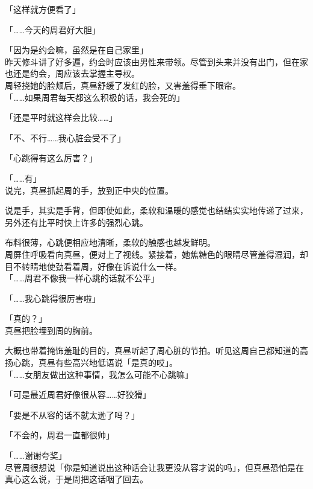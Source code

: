 「这样就方便看了」

「……今天的周君好大胆」

「因为是约会嘛，虽然是在自己家里」\\

昨天修斗讲了好多遍，约会时应该由男性来带领。尽管到头来并没有出门，但在家也还是约会，周应该去掌握主导权。\\

周轻挠她的脸颊后，真昼舒缓了发红的脸，又害羞得垂下眼帘。\\

「……如果周君每天都这么积极的话，我会死的」

「还是平时就这样会比较……」

「不、不行……我心脏会受不了」

「心跳得有这么厉害？」

「……有」\\

说完，真昼抓起周的手，放到正中央的位置。

说是手，其实是手背，但即使如此，柔软和温暖的感觉也结结实实地传递了过来，另外还有比平时快上许多的强烈心跳。

布料很薄，心跳便相应地清晰，柔软的触感也越发鲜明。\\

周屏住呼吸看向真昼，便对上了视线。紧接着，她焦糖色的眼睛尽管羞得湿润，却目不转睛地使劲看着周，好像在诉说什么一样。\\

「……周君不像我一样心跳的话就不公平」

「……我心跳得很厉害啦」

「真的？」\\

真昼把脸埋到周的胸前。

大概也带着掩饰羞耻的目的，真昼听起了周心脏的节拍。听见这周自己都知道的高扬心跳，真昼有些高兴地低语说「是真的哎」。\\

「……女朋友做出这种事情，我怎么可能不心跳嘛」

「可是最近周君好像很从容……好狡猾」

「要是不从容的话不就太逊了吗？」

「不会的，周君一直都很帅」

「……谢谢夸奖」\\

尽管周很想说「你是知道说出这种话会让我更没从容才说的吗」，但真昼恐怕是在真心这么说，于是周把这话咽了回去。\\


